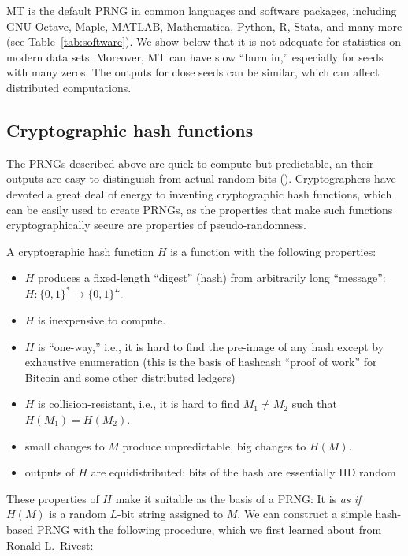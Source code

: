 \documentclass[graybox]{svmult}
\newcommand{\todo}[1]{{\color{red}{TO DO: \sc #1}}}
\begin{document}
MT is the default PRNG in common languages and software packages, including GNU Octave, Maple, MATLAB, Mathematica, Python, R, Stata, and many more (see Table~\ref{tab:software}).
We show below that it is not adequate for statistics on modern data sets.
Moreover, MT can have slow ``burn in,'' especially for seeds with many zeros. \todo{CITE: MT website or the revised seeding paper.}
The outputs for close seeds can be similar, which can affect distributed computations.

\subsection{Cryptographic hash functions}
The PRNGs described above are quick to compute but predictable,
an their outputs are easy to distinguish from actual random bits (\cite{lecuyer_testu01_2007}).
Cryptographers have devoted a great deal of energy to inventing cryptographic 
hash functions, which can be easily used to create PRNGs, as the properties that make such functions cryptographically secure
are properties of pseudo-randomness.

A cryptographic hash function $H$ is a function with the following properties:

\begin{itemize}
\item $H$ produces a fixed-length ``digest'' (hash) from arbitrarily long ``message'': $H:\{0, 1\}^* \rightarrow \{0, 1\}^L$.
\item $H$ is inexpensive to compute.
\item $H$ is ``one-way,'' i.e., it is hard to find the pre-image of any hash except by exhaustive enumeration (this is the basis of  hashcash ``proof of work'' for Bitcoin and some other distributed ledgers)
\item $H$ is collision-resistant, i.e., it is hard to find $M_1 \ne M_2$ such that $H(M_1) = H(M_2)$.
\item small changes to $M$ produce unpredictable, big changes to $H(M)$.
\item outputs of $H$ are equidistributed: bits of the hash are essentially IID random 
\end{itemize}

These properties of $H$ make it suitable as the basis of a PRNG:
It is \emph{as if} $H(M)$ is a random $L$-bit string assigned to $M$.
We can construct a simple hash-based PRNG with the following procedure, which we first learned about
from Ronald L.~Rivest:
\end{document}
